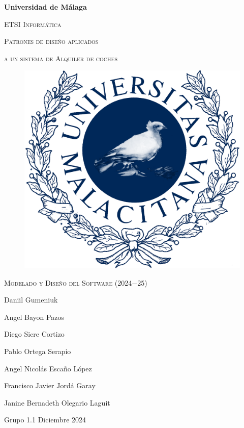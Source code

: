 \documentclass[12pt, a4paper, titlepage]{article}
\begin{document}
\begin{titlepage}
  \centering
  {\bfseries\LARGE Universidad de Málaga\par}
  \vspace{1cm}
  {\scshape\Large ETSI Informática\par}
  \vspace{2cm}
  {\scshape\Huge Patrones de diseño aplicados\par}
  \vspace{0.1cm}
  {\scshape\Huge a un sistema de Alquiler de coches}
  \vspace{2cm}
  \begin{figure}[H]
      \centering
       \includegraphics[width=0.30\linewidth]{assets/umaLogo.png}
  \end{figure}
  \vfill
  {\scshape\Large Modelado y Diseño del Software (2024$-$25)\par}
  \vspace{0.5cm}
  {\Large Daniil Gumeniuk\par}
  {\Large Angel Bayon Pazos\par}
  {\Large Diego Sicre Cortizo\par}
  {\Large Pablo Ortega Serapio\par}
  {\Large Angel Nicolás Escaño López\par}
  {\Large Francisco Javier Jordá Garay\par}
  {\Large Janine Bernadeth Olegario Laguit\par}
  \vspace{1cm}
  {\Large Grupo 1.1}
  \vfill
  {\Large Diciembre 2024}
  
  \end{titlepage}

\tableofcontents %
\thispagestyle{empty} %

\newpage

\listoffigures %
\thispagestyle{empty}
\end{document}
